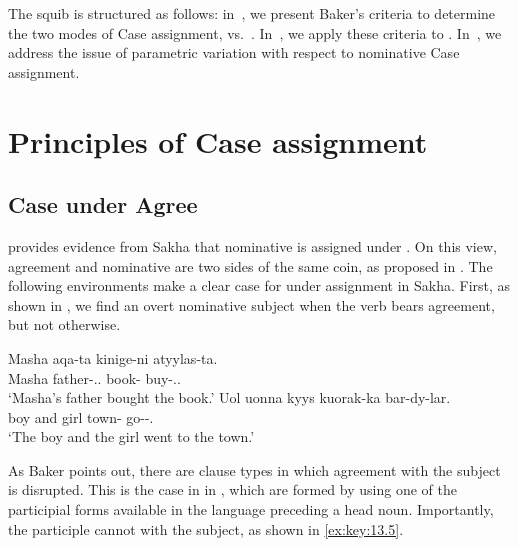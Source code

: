 \documentclass[output=paper]{langsci/langscibook}
\begin{document}
The squib is structured as follows: in~, we
present Baker’s criteria to determine the two modes of Case assignment,
 vs.\ . In~, we apply these
criteria to .  In~, we address the issue of
parametric variation with respect to nominative Case
assignment.

\section{Principles of Case assignment}\label{sec:key:13.2}

\subsection{Case under Agree}\label{sec:key:13.2.1}

\textcite[29f.]{Baker2015} provides evidence from Sakha that
nominative is assigned under . On this view,
agreement and nominative are two sides of the same coin, as
proposed in \citet{Chomsky2001}. The following environments make a clear case
for \Nom{} under  assignment in Sakha. First, as shown in
, we find an overt nominative subject when
the verb bears agreement, but not otherwise.

\ea%
    \label{ex:key:13.4}  \parencite[29]{Baker2015}
	\ea
	\gll  Masha aqa-ta kinige-ni atyylas-ta.\\
	    Masha father-\Tsg.\Poss{}.\Nom{}  book-\Acc{}  buy-\Pst{}.\Tsg.\Sbj{}\\
	\glt     ‘Masha’s father bought the book.’
	\ex
	\gll  Uol uonna kyys kuorak-ka bar-dy-lar.\\
        boy and girl town-\Dat{}  go-\Pst{}-\Tpl.\Sbj{}\\
	\glt     ‘The boy and the girl went to the town.’
    \z
\z

As Baker points out, there are clause types in which agreement with the
subject
is disrupted. This is the case in  in , which are formed
by using one of the participial forms available in the language preceding a
head noun. Importantly, the participle cannot  with the subject, as shown
in \eqref{ex:key:13.5}.

\ea%
    \label{ex:key:13.5} \parencite[30]{Baker2015}
\z
\end{document}
